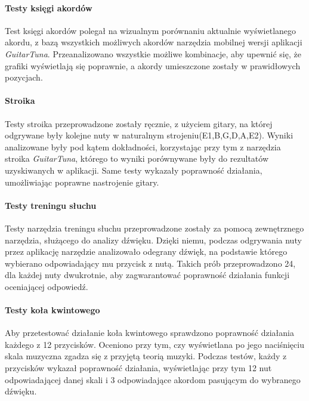\paragraph{Testy księgi akordów}

Test księgi akordów polegał na wizualnym porównaniu aktualnie wyświetlanego akordu, z bazą wszystkich możliwych akordów narzędzia mobilnej wersji aplikacji \emph{GuitarTuna}.  Przeanalizowano wszystkie możliwe kombinacje, aby upewnić się, że grafiki wyświetlają się poprawnie, a akordy umieszczone zostały w prawidłowych pozycjach.

\paragraph{Stroika}

Testy stroika przeprowadzone zostały ręcznie, z użyciem gitary, na której odgrywane były kolejne nuty w naturalnym strojeniu(E1,B,G,D,A,E2). Wyniki analizowane były pod kątem dokładności, korzystając przy tym z narzędzia stroika \emph{GuitarTuna}, którego to wyniki porównywane były do rezultatów uzyskiwanych w aplikacji. Same testy wykazały poprawność działania, umożliwiając poprawne nastrojenie gitary. 

\paragraph{Testy treningu słuchu}

Testy narzędzia treningu słuchu przeprowadzone zostały za pomocą zewnętrznego narzędzia, służącego do analizy dźwięku. Dzięki niemu, podczas odgrywania nuty przez aplikację narzędzie analizowało odegrany dźwięk, na podstawie którego wybierano odpowiadający mu przycisk z nutą. Takich prób przeprowadzono 24, dla każdej nuty dwukrotnie, aby zagwarantować poprawność działania funkcji oceniającej odpowiedź.

\paragraph{Testy koła kwintowego}

Aby przetestować działanie koła kwintowego sprawdzono poprawność działania każdego z 12 przycisków. Oceniono przy tym, czy wyświetlana po jego naciśnięciu skala muzyczna zgadza się z przyjętą teorią muzyki. Podczas testów, każdy z przycisków wykazał poprawność działania, wyświetlając przy tym 12 nut odpowiadającej danej skali i 3 odpowiadające akordom pasującym do wybranego dźwięku. 